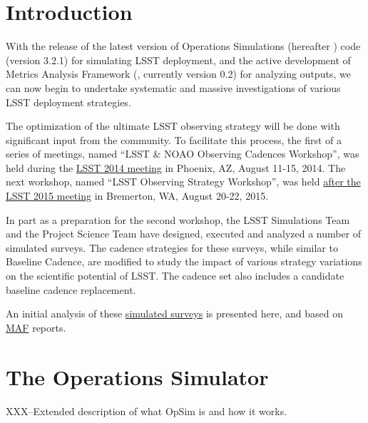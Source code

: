 
\section{Introduction}
\def\secname{cadexp:intro}\label{sec:\secname}

With the release of the latest version of Operations Simulations
(hereafter \OpSim) code (version 3.2.1)  for simulating LSST
deployment, and the active development of Metrics Analysis Framework
(\MAF,  currently version 0.2) for analyzing \OpSim outputs, we can
now begin to undertake systematic and  massive investigations of
various LSST deployment strategies.

The optimization of the ultimate LSST observing strategy will be done
with significant input from  the community. To facilitate this
process, the first of a series of meetings, named ``LSST \& NOAO
Observing Cadences Workshop'', was held during the
\href{https://project.lsst.org/meetings/ocw}{LSST 2014 meeting} in
Phoenix, AZ, August 11-15, 2014. The next workshop, named ``LSST
Observing Strategy Workshop'',  was held
\href{http://lsstsciencecollaborations.github.io/ObservingStrategy/}{after
the LSST 2015 meeting} in Bremerton, WA, August 20-22, 2015.

In part as a preparation for the second workshop, the LSST
Simulations Team and the Project Science Team have designed, executed
and analyzed a number of simulated surveys.  The cadence strategies
for these surveys, while similar to Baseline Cadence, are modified to
study the impact of various strategy variations on the scientific
potential of LSST\@. The cadence set also includes a candidate baseline
cadence replacement.

An initial analysis of these
\href{http://ops2.lsst.org:8080}{simulated surveys} is presented here,
and based on \href{https://confluence.lsstcorp.org/display/SIM/MAF+documentation}{MAF}
reports.


\listofopsimdbs

\navigationbar


\section{The Operations Simulator}
XXX--Extended description of what OpSim is and how it works.

